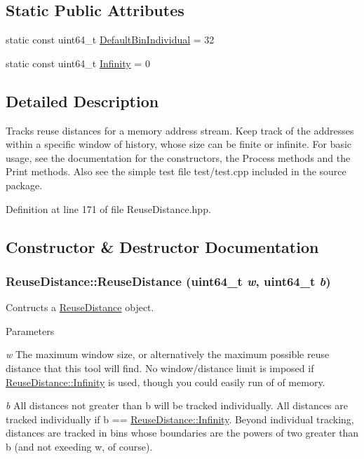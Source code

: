 \subsection*{Static Public Attributes}
\begin{DoxyCompactItemize}
\item 
static const uint64\_\-t \hyperlink{class_reuse_distance_af0d9cba7105109e89ae6b7177f54c976}{DefaultBinIndividual} = 32
\item 
static const uint64\_\-t \hyperlink{class_reuse_distance_a59f7f0ac6ad014472537619394ac7375}{Infinity} = 0
\end{DoxyCompactItemize}


\subsection{Detailed Description}
Tracks reuse distances for a memory address stream. Keep track of the addresses within a specific window of history, whose size can be finite or infinite. For basic usage, see the documentation for the constructors, the Process methods and the Print methods. Also see the simple test file test/test.cpp included in the source package. 

Definition at line 171 of file ReuseDistance.hpp.

\subsection{Constructor \& Destructor Documentation}
\hypertarget{class_reuse_distance_a0248afa697da0f6c87c6fd30c289ecc6}{
\subsubsection[{ReuseDistance}]{\setlength{\rightskip}{0pt plus 5cm}ReuseDistance::ReuseDistance (uint64\_\-t {\em w}, \/  uint64\_\-t {\em b})}}
\label{class_reuse_distance_a0248afa697da0f6c87c6fd30c289ecc6}
Contructs a \hyperlink{class_reuse_distance}{ReuseDistance} object.


\begin{DoxyParams}{Parameters}
\item[{\em w}]The maximum window size, or alternatively the maximum possible reuse distance that this tool will find. No window/distance limit is imposed if \hyperlink{class_reuse_distance_a59f7f0ac6ad014472537619394ac7375}{ReuseDistance::Infinity} is used, though you could easily run of of memory. \item[{\em b}]All distances not greater than b will be tracked individually. All distances are tracked individually if b == \hyperlink{class_reuse_distance_a59f7f0ac6ad014472537619394ac7375}{ReuseDistance::Infinity}. Beyond individual tracking, distances are tracked in bins whose boundaries are the powers of two greater than b (and not exeeding w, of course). \end{DoxyParams}


